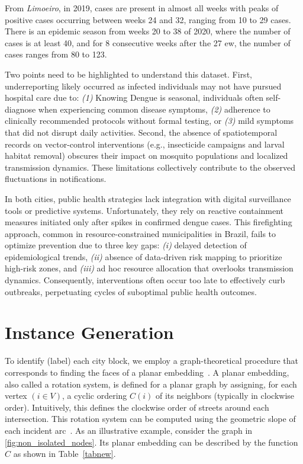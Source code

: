 From \textit{Limoeiro}, in 2019, cases are present in almost all weeks with peaks of positive cases occurring between weeks 24 and 32, ranging from 10 to 29 cases. There is an epidemic season from weeks 20 to 38 of 2020, where the number of cases is at least 40, and for 8 consecutive weeks after the 27 \gls{ew}, the number of cases ranges from 80 to 123.

Two points need to be highlighted to understand this dataset. 
First, underreporting likely occurred as infected individuals may not have pursued hospital care due to: \textit{(1)} Knowing Dengue is seasonal, individuals often self-diagnose when experiencing common disease symptoms, \textit{(2)} adherence to clinically recommended protocols without formal testing, or \textit{(3)} mild symptoms that did not disrupt daily activities. Second, the absence of spatiotemporal records on vector-control interventions (e.g., insecticide campaigns and larval habitat removal) obscures their impact on mosquito populations and localized transmission dynamics. These limitations collectively contribute to the observed fluctuations in notifications.

In both cities, public health strategies lack integration with digital surveillance tools or predictive systems. Unfortunately, they rely on reactive containment measures initiated only after spikes in confirmed dengue cases. This firefighting approach, common in resource-constrained municipalities in Brazil, fails to optimize prevention due to three key gaps: \textit{(i)} delayed detection of epidemiological trends, \textit{(ii)} absence of data-driven risk mapping to prioritize high-risk zones, and \textit{(iii)} ad hoc resource allocation that overlooks transmission dynamics. Consequently, interventions often occur too late to effectively curb outbreaks, perpetuating cycles of suboptimal public health outcomes.

\section{Instance Generation}\label{sec:instance-generation}

To identify (label) each city block, we employ a graph-theoretical procedure
that corresponds to finding the faces of a planar
embedding~\citep{diestel2024graph}. A planar embedding, also called a rotation
system, is defined for a planar graph by assigning, for each vertex $( i \in V
	)$, a cyclic ordering $C(i)$ of its neighbors (typically in clockwise order).
Intuitively, this defines the clockwise order of streets around each
intersection. This rotation system can be computed using the geometric slope of
each incident arc~\citep{PhilipKleinShayMozes}. As an illustrative example,
consider the graph in \ref{fig:non_isolated_nodes}. Its planar embedding can be
described by the function $C$ as shown in Table~\ref{tabnew}.

